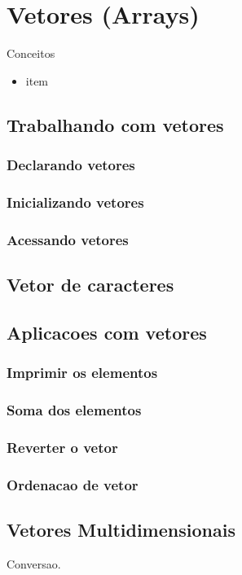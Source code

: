 
\chapter{Vetores (Arrays)}
Conceitos

\begin{itemize}
  \item item
\end{itemize}

\section{Trabalhando com vetores}
\subsection{Declarando vetores}
\subsection{Inicializando vetores}
\subsection{Acessando vetores}

\section{Vetor de caracteres}

\section{Aplicacoes com vetores}
\subsection{Imprimir os elementos}
\subsection{Soma dos elementos}
\subsection{Reverter o vetor}
\subsection{Ordenacao de vetor}

\section{Vetores Multidimensionais}
Conversao.




